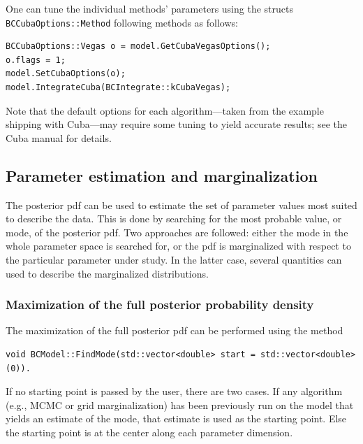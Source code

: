 \documentclass[11pt, a4paper]{article}
\begin{document}
One can tune the individual methods' parameters using the structs
\verb|BCCubaOptions::Method| following methods as follows:
%
\begin{verbatim}
BCCubaOptions::Vegas o = model.GetCubaVegasOptions();
o.flags = 1;
model.SetCubaOptions(o);
model.IntegrateCuba(BCIntegrate::kCubaVegas);
\end{verbatim}
%
Note that the default options for each algorithm---taken from the
example shipping with Cuba---may require some tuning to yield accurate
results; see the Cuba manual for details.


\subsection{Parameter estimation and marginalization}

The posterior pdf can be used to estimate the set of parameter values
most suited to describe the data. This is done by searching for the
most probable value, or mode, of the posterior pdf. Two approaches are
followed: either the mode in the whole parameter space is searched
for, or the pdf is marginalized with respect to the particular
parameter under study. In the latter case, several quantities can used
to describe the marginalized distributions.


\subsubsection{Maximization of the full posterior probability density}

The maximization of the full posterior pdf can be performed using the
method
%
\begin{verbatim}
void BCModel::FindMode(std::vector<double> start = std::vector<double>(0)).
\end{verbatim}
If no starting point is passed by the user, there are two cases. If
any algorithm (e.g., MCMC or grid marginalization) has been previously
run on the model that yields an estimate of the mode, that estimate is
used as the starting point. Else the starting point is at the center
along each parameter dimension.
\end{document}

